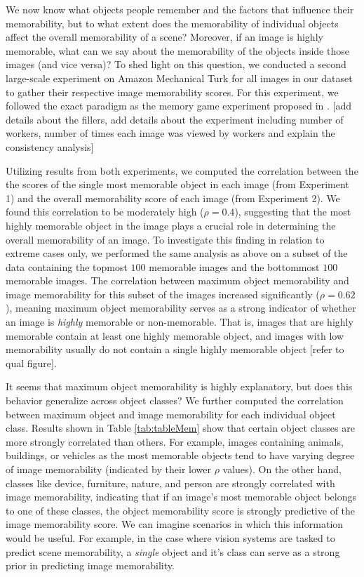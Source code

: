 We now know what objects people remember and the factors that influence their memorability, but to what extent does the memorability of individual objects affect the overall memorability of a scene? Moreover, if an image is highly memorable, what can we say about the memorability of the objects inside those images (and vice versa)? To shed light on this question, we conducted a second large-scale experiment on Amazon Mechanical Turk for all images in our dataset to gather their respective image memorability scores. For this experiment, we followed the exact paradigm as the memory game experiment proposed in \cite{isola11}. [add details about the fillers, add details about the experiment including number of workers, number of times each image was viewed by workers and explain the consistency analysis]

Utilizing results from both experiments, we computed the correlation between the the scores of the single most memorable object in each image (from Experiment 1) and the overall memorability score of each image (from Experiment 2). We found this correlation to be moderately high ($\rho=0.4$), suggesting that the most highly memorable object in the image plays a crucial role in determining the overall memorability of an image. To investigate this finding in relation to extreme cases only, we performed the same analysis as above on a subset of the data containing the topmost $100$ memorable images and the bottommost $100$ memorable images. The correlation between maximum object memorability and image memorability for this subset of the images increased significantly ($\rho=0.62$), meaning maximum object memorability serves as a strong indicator of whether an image is \textit{highly} memorable or non-memorable. That is, images that are highly memorable contain at least one highly memorable object, and images with low memorability usually do not contain a single highly memorable object [refer to qual figure].

It seems that maximum object memorability is highly explanatory, but does this behavior generalize across object classes? We further computed the correlation between maximum object and image memorability for each individual object class. Results shown in  Table \ref{tab:tableMem} show that certain object classes are more strongly correlated than others.  For example, images containing animals, buildings, or vehicles as the most memorable objects tend to have varying degree of image memorability (indicated by their lower $\rho$ values). On the other hand, classes like device, furniture, nature, and person are strongly correlated with image memorability, indicating that if an image’s most memorable object belongs to one of these classes, the object memorability score is strongly predictive of the image memorability score. We can imagine scenarios in which this information would be useful. For example, in the case where vision systems are tasked to predict scene memorability, a \textit{single} object and it’s class can serve as a strong prior in predicting image memorability.


